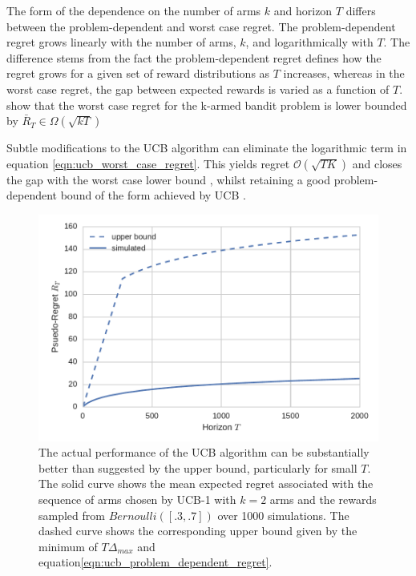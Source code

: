 \documentclass[11pt,a4paper,twoside]{report}
\newcommand{\bigo}[1]{\mathcal{O}\left( #1 \right)}
\newcommand{\bigomega}[1]{\Omega\left( #1 \right)}
\newcommand{\regret}{\bar{R}_{T}} %
\theoremstyle{plain}
\theoremstyle{definition}
\begin{document}
The form of the dependence on the number of arms $k$ and horizon $T$ differs between the problem-dependent and worst case regret. The problem-dependent regret grows linearly with the number of arms, $k$, and logarithmically with $T$. The difference stems from the fact the problem-dependent regret defines how the regret grows for a given set of reward distributions as $T$ increases, whereas in the worst case regret, the gap between expected rewards is varied as a function of $T$. \citet{Auer1995} show that the worst case regret for the k-armed bandit problem is lower bounded by $\regret \in \bigomega{\sqrt{kT}}$

Subtle modifications to the UCB algorithm can eliminate the logarithmic term in equation \ref{eqn:ucb_worst_case_regret}. This yields regret $ \bigo{\sqrt{TK}}$ and closes the gap with the worst case lower bound \citep{Audibert2009,Lattimore2015}, whilst retaining a good problem-dependent bound of the form achieved by UCB \citep{Lattimore2015}.

\begin{figure}
\includegraphics[scale=1]{upper_bound_vs_actual_average_regret}
\caption{The actual performance of the UCB algorithm can be substantially better than suggested by the upper bound, particularly for small $T$. The solid curve shows the mean expected regret associated with the sequence of arms chosen by UCB-1 with $k=2$ arms and the rewards sampled from $Bernoulli([.3,.7])$ over 1000 simulations. The dashed curve shows the corresponding upper bound given by the minimum of $T\Delta_{max}$ and equation\ref{eqn:ucb_problem_dependent_regret}.}
\label{fig:ucb_upperbound_vs_actual_performance}
\end{figure}
\end{document}
